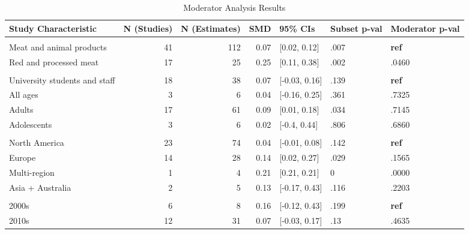 \documentclass[sn-nature,referee,pdflatex]{sn-jnl}
\begin{document}
\begin{table}[!h]
\centering
\caption{\label{tab:table_two}Moderator Analysis Results}
\centering
\begin{tabular}[t]{lrrrlll}
\toprule
Study Characteristic & N (Studies) & N (Estimates) & SMD & 95\% CIs & Subset p-val & Moderator p-val\\
\midrule
\addlinespace[0.3em]
\multicolumn{7}{l}{\textbf{Outcome}}\\
\hspace{1em}Meat and animal products & 41 & 112 & 0.07 & {}[0.02, 0.12] & .007 & \textbf{ref}\\
\hspace{1em}Red and processed meat & 17 & 25 & 0.25 & {}[0.11, 0.38] & .002 & .0460\\
\addlinespace[0.3em]
\multicolumn{7}{l}{\textbf{Population}}\\
\hspace{1em}University students and staff & 18 & 38 & 0.07 & {}[-0.03, 0.16] & .139 & \textbf{ref}\\
\hspace{1em}All ages & 3 & 6 & 0.04 & {}[-0.16, 0.25] & .361 & .7325\\
\hspace{1em}Adults & 17 & 61 & 0.09 & {}[0.01, 0.18] & .034 & .7145\\
\hspace{1em}Adolescents & 3 & 6 & 0.02 & {}[-0.4, 0.44] & .806 & .6860\\
\addlinespace[0.3em]
\multicolumn{7}{l}{\textbf{Region}}\\
\hspace{1em}North America & 23 & 74 & 0.04 & {}[-0.01, 0.08] & .142 & \textbf{ref}\\
\hspace{1em}Europe & 14 & 28 & 0.14 & {}[0.02, 0.27] & .029 & .1565\\
\hspace{1em}Multi-region & 1 & 4 & 0.21 & {}[0.21, 0.21] & 0 & .0000\\
\hspace{1em}Asia + Australia & 2 & 5 & 0.13 & {}[-0.17, 0.43] & .116 & .2203\\
\addlinespace[0.3em]
\multicolumn{7}{l}{\textbf{Publication Decade}}\\
\hspace{1em}2000s & 6 & 8 & 0.16 & {}[-0.12, 0.43] & .199 & \textbf{ref}\\
\hspace{1em}2010s & 12 & 31 & 0.07 & {}[-0.03, 0.17] & .13 & .4635\\

\end{tabular}
\end{table}
\end{document}
